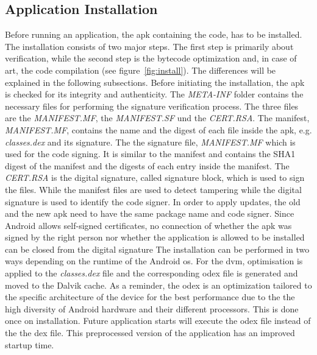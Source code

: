 \subsection{Application Installation} \label{subsection:android-install}
Before running an application, the \gls{apk} containing the code, has to be installed.
The installation consists of two major steps.
The first step is primarily about verification, while the second step is the bytecode optimization and, in case of \gls{art}, the code compilation (see figure~\ref{fig:install}).
The differences will be explained in the following subsections.
\newline
Before initiating the installation, the \gls{apk} is checked for its integrity and authenticity.
The \textit{META-INF} folder contains the necessary files for performing the signature verification process.
The three files are the \textit{MANIFEST.MF}, the \textit{MANIFEST.SF} und the \textit{CERT.RSA}.
The manifest, \textit{MANIFEST.MF}, contains the name and the digest of each file inside the \gls{apk}, e.g. \textit{classes.dex} and its signature.
The the signature file, \textit{MANIFEST.MF} which is used for the code signing.
It is similar to the manifest and contains the SHA1 digest of the manifest and the digests of each entry inside the manifest.
The \textit{CERT.RSA} is the digital signature, called signature block, which is used to sign the files.
While the manifest files are used to detect tampering while the digital signature is used to identify the code signer.
In order to apply updates, the old and the new \gls{apk} need to have the same package name and code signer.
Since Android allows self-signed certificates, no connection of whether the \gls{apk} was signed by the right person nor whether the application is allowed to be installed can be closed from the digital signature
\cite{codeSigning} \cite{androidSigning}
\newline
The installation can be performed in two ways depending on the runtime of the Android \gls{os}.
For the \gls{dvm}, optimisation is applied to the \textit{classes.dex} file and the corresponding \gls{odex} file is generated and moved to the Dalvik cache.
As a reminder, the \gls{odex} is an optimization tailored to the specific architecture of the device for the best performance due to the the high diversity of Android hardware and their different processors.
This is done once on installation.
Future application starts will execute the \gls{odex} file instead of the the \gls{dex} file.
This preprocessed version of the application has an improved startup time. \cite{kovachevaMaster}
